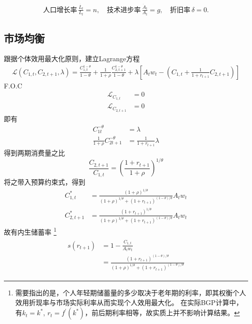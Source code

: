\documentclass[cn,normal,11pt,black]{elegantnote}
\begin{document}
\begin{definition}[投入要素]
\begin{align}
    \mbox{人口增长率} \, \frac{\dot{L_t}}{L_t} = n, \quad
    \mbox{技术进步率} \, \frac{\dot{A}_t}{A_t} = g, \quad
    \mbox{折旧率} \, \delta = 0.
\end{align}
\end{definition}

\subsection{市场均衡}

跟据个体效用最大化原则，建立Lagrange方程
\begin{align}
    \mathcal{L}( C_{1,t}, C_{2,t+1}, \lambda) =
        \frac{C_{1,t}^{1-\theta}}{1-\theta}+\frac{1}{1+\rho} \frac{C_{2, t+1}^{1-\theta}}{1-\theta} + 
        \lambda\left[A_{t} w_{t}-\left(C_{1,t}+\frac{1}{1+r_{t+1}} C_{2,t+1}\right)\right]
\end{align}
F.O.C
\begin{align}
    \mathcal{L}_{C_{1,t}} & = 0 \\
    \mathcal{L}_{ C_{2,t+1}} & = 0
\end{align}
即有
\begin{align}
    C_{1 t}^{-\theta} & = \lambda \\ 
    \frac{1}{1+\rho} C_{2 t+1}^{-\theta} & = \frac{1}{1+r_{t+1}} \lambda
\end{align}
得到两期消费量之比
\begin{equation}
    \frac{C_{2,t+1}}{C_{1,t}} = \left( \frac{1+r_{t+1}}{1+\rho}\right)^{1/\theta}
\end{equation}
将之带入预算约束式，得到
\begin{align}
    C^*_{1,t} & = \frac{(1+\rho)^{1/\theta}}{(1+\rho)^{1/\theta} + (1+r_{t+1})^{(1-\theta)/\theta}} A_t w_t \\
    C^*_{2,t+1} & = \frac{(1+ r_{t+1})^{1/\theta}}{(1+\rho)^{1/\theta} + (1+r_{t+1})^{(1-\theta)/\theta}} A_t w_t 
\end{align}
故有内生储蓄率
\footnote{需要指出的是，个人年轻期储蓄量的多少取决于老年期的利率，即其权衡个人效用折现率与市场实际利率从而实现个人效用最大化。
          在实际BGP计算中，有$k_t = k^*$, $r_t = f^\prime(k^*)$，前后期利率相等，故实质上并不影响计算结果。}
\begin{align}\label{olgk}
\begin{aligned}
    s(r_{t+1}) & = 1 - \frac{C_{1,t}}{A_t w_t} \\
           & = \frac{(1+r_{t+1})^{(1-\theta)/\theta}}{(1+\rho)^{1/\theta} + (1+r_{t+1})^{(1-\theta)/\theta}}    
\end{aligned}
\end{align}
\end{document}
